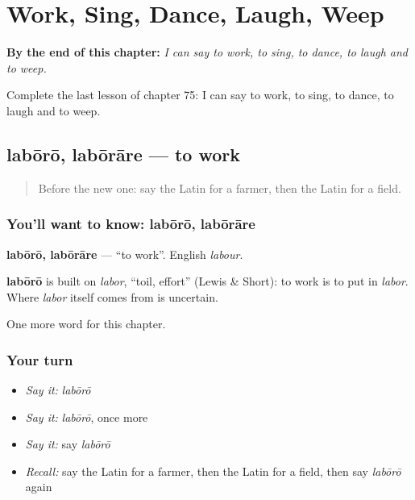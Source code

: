 
\chapter{Work, Sing, Dance, Laugh, Weep}
\label{ch:la-work-sing-dance-laugh-weep}

\begin{chapteropening}
\textbf{By the end of this chapter:} \emph{I can say to work, to sing, to dance, to laugh and to weep.}

Complete the last lesson of chapter 75: I can say to work, to sing, to dance, to laugh and to weep.
\end{chapteropening}

\section[labōrō, labōrāre]{labōrō, labōrāre — to work}

\label{lesson:LA-C75-laboro}



\begin{quote}
Before the new one: say the Latin for a farmer, then the Latin for a field.
\end{quote}

\subsection*{You'll want to know: labōrō, labōrāre}
\textbf{labōrō, labōrāre} — \textquotedblleft{}to work\textquotedblright{}. English \emph{labour}.

\begin{cousinweb}
\textbf{labōrō} is built on \emph{labor}, \textquotedblleft{}toil, effort\textquotedblright{} (Lewis \& Short): to work is to put in \emph{labor}. Where \emph{labor} itself comes from is uncertain.
\end{cousinweb}

\begin{grammarlens}[title={What you've built}]
One more word for this chapter.
\end{grammarlens}

\subsection*{Your turn}
\begin{itemize}
\raggedright
  \item \emph{Say it:} \emph{labōrō}
  \item \emph{Say it:} \emph{labōrō}, once more
  \item \emph{Say it:} say \emph{labōrō}
  \item \emph{Recall:} say the Latin for a farmer, then the Latin for a field, then say \emph{labōrō} again
\end{itemize}

